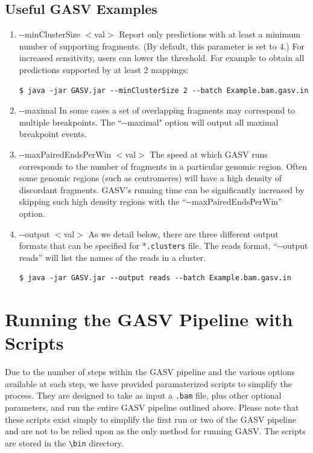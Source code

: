 \documentclass[11pt]{article}
\begin{document}
\subsection{Useful GASV Examples} 
\begin{enumerate}

\item -{}-minClusterSize $<$val$>$
Report only predictions with at least a minimum number of supporting 
fragments. (By default, this parameter is set to 4.) For increased sensitivity, users can lower the threshold. For example to obtain all predictions supported by at least 2 mappings:

\begin{framed}
{ \small
\begin{Verbatim}
$ java -jar GASV.jar --minClusterSize 2 --batch Example.bam.gasv.in
\end{Verbatim}
}
\end{framed}

\item -{}-maximal
In some cases a set of overlapping fragments may correspond to 
multiple breakpoints. The ``-{}-maximal" option will output 
all maximal breakpoint events.

\item -{}-maxPairedEndsPerWin $<$val$>$
The speed at which GASV runs corresponds to the number of fragments in 
a particular genomic region. Often some genomic regions (such as centromeres) 
will have a high density of discordant fragments. GASV's running time
can be significantly increased by skipping such high density regions with 
the ``-{}-maxPairedEndsPerWin'' option.

\item -{}-output $<$val$>$
As we detail below, there are three different output formats
that can be specified for *\verb+.clusters+ file. The reads format, ``-{}-output reads'' 
will list the names of the reads in a cluster. 

\begin{framed}
{\small
\begin{Verbatim}
$ java -jar GASV.jar --output reads --batch Example.bam.gasv.in
\end{Verbatim}
}
\end{framed}

\end{enumerate}

\clearpage

\section{Running the GASV Pipeline with Scripts}
Due to the number of steps within the GASV pipeline and the various options available at each step, we have provided paramaterized scripts to simplify the process. They are designed to take as input a \verb+.bam+ file, plus other optional parameters, and run the entire GASV pipeline outlined above. Please note that these scripts exist simply to simplify the first run or two of the GASV pipeline and are not to be relied upon as the only method for running GASV. The scripts are stored in the \verb+\bin+ directory.
\end{document}
